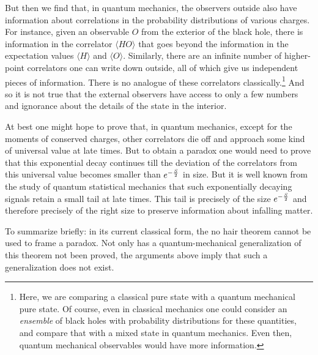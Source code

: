 \documentclass[12pt]{article}
\begin{document}
\begin{enumerate}[label={\bf Q\arabic*}, series=qseries]
But then we find that, in quantum mechanics, the observers outside also have information about correlations in the probability distributions of various charges. For instance, given an observable $O$ from the exterior of the black hole, there is  information in  the correlator  $\langle H O \rangle$ that goes beyond the information in the expectation values $\langle H \rangle$ and $\langle O \rangle$. Similarly, there are an infinite number of higher-point correlators one can write down outside, all of which give us independent pieces of information. There is no analogue of these correlators classically.\footnote{Here, we are comparing a classical pure state with a quantum mechanical pure state. Of course, even in classical mechanics one could consider an {\em ensemble} of black holes with probability distributions for these quantities, and compare that with a mixed state in quantum mechanics. Even then, quantum mechanical observables would have more information.} And so it is not true that the external observers have access to only a few numbers and ignorance about the details of the state in the interior. 

At best one might hope to prove that, in quantum mechanics, except for the moments of conserved charges, other correlators die off and approach some kind of universal value at late times. But to obtain a paradox one would need to prove that this exponential decay continues
till the deviation of the correlators from this universal value becomes smaller than $e^{-{S \over 2}}$ in size. But it is well known from the study of quantum statistical mechanics that such exponentially decaying signals retain a small tail at late times. This tail is precisely of the size $e^{-{S \over 2}}$ and therefore precisely of the right size to preserve information about infalling matter. 

To summarize briefly: in its current classical form, the no hair theorem cannot be used to frame a paradox. Not only has a quantum-mechanical generalization of this theorem not been proved, the arguments above imply that such a generalization does not exist.

































\end{enumerate}
\end{document}
